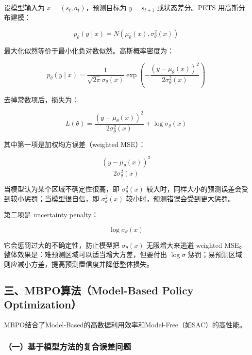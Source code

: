 设模型输入为 \(x=(s_t,a_t)\)，预测目标为 \(y=s_{t+1}\) 或状态差分。PETS 用高斯分布建模：

\[
p_\theta(y\mid x)=N(\mu_\theta(x),\sigma_\theta^2(x))
\]

最大化似然等价于最小化负对数似然。高斯概率密度为：

\[
p_\theta(y\mid x)=\frac{1}{\sqrt{2\pi}\sigma_\theta(x)}
\exp\left(-\frac{(y-\mu_\theta(x))^2}{2\sigma_\theta^2(x)}\right)
\]

去掉常数项后，损失为：

\[
L(\theta)=\frac{(y-\mu_\theta(x))^2}{2\sigma_\theta^2(x)}+\log\sigma_\theta(x)
\]

其中第一项是加权均方误差（weighted MSE）：

\[
\frac{(y-\mu_\theta(x))^2}{2\sigma_\theta^2(x)}
\]

当模型认为某个区域不确定性很高，即 \(\sigma_\theta^2(x)\) 较大时，同样大小的预测误差会受到较小惩罚；当模型很自信，即 \(\sigma_\theta^2(x)\) 较小时，预测错误会受到更大惩罚。

第二项是 uncertainty penalty：

\[
\log\sigma_\theta(x)
\]

它会惩罚过大的不确定性，防止模型把 \(\sigma_\theta(x)\) 无限增大来逃避 weighted MSE。整体效果是：难预测区域可以适当增大方差，但要付出 \(\log\sigma\) 惩罚；易预测区域则应减小方差，提高预测置信度并降低整体损失。

\hypertarget{ux4e09mbpoux7b97ux6cd5model-based-policy-optimization}{%
\subsection{三、MBPO算法（Model-Based Policy Optimization）}\label{ux4e09mbpoux7b97ux6cd5model-based-policy-optimization}}

MBPO结合了Model-Based的高数据利用效率和Model-Free（如SAC）的高性能。

\hypertarget{ux4e00ux57faux4e8eux6a21ux578bux65b9ux6cd5ux7684ux590dux5408ux8befux5deeux95eeux9898}{%
\subsubsection{（一）基于模型方法的复合误差问题}\label{ux4e00ux57faux4e8eux6a21ux578bux65b9ux6cd5ux7684ux590dux5408ux8befux5deeux95eeux9898}}

